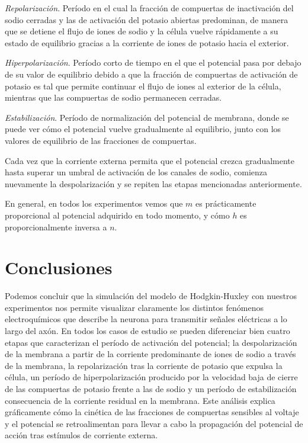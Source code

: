 \documentclass[aps,twocolumn,groupedaddress]{revtex4-2}
\begin{document}
\textit{Repolarización}. Período en el cual la fracción de compuertas de inactivación del sodio cerradas y las de activación del potasio abiertas predominan, de manera que se detiene el flujo de iones de sodio y la célula vuelve rápidamente a su estado de equilibrio gracias a la corriente de iones de potasio hacia el exterior.

\textit{Hiperpolarización}. Período corto de tiempo en el que el potencial pasa por debajo de su valor de equilibrio debido a que la fracción de compuertas de activación de potasio es tal que permite continuar el flujo de iones al exterior de la célula, mientras que las compuertas de sodio permanecen cerradas.

\textit{Estabilización}. Período de normalización del potencial de membrana, donde se puede ver cómo el potencial vuelve gradualmente al equilibrio, junto con los valores de equilibrio de las fracciones de compuertas.

Cada vez que la corriente externa permita que el potencial crezca gradualmente hasta superar un umbral de activación de los canales de sodio, comienza nuevamente la despolarización y se repiten las etapas mencionadas anteriormente.

En general, en todos los experimentos vemos que  $m$ es prácticamente proporcional al potencial adquirido en todo momento, y cómo $h$ es proporcionalmente inversa a $n$.

\section{Conclusiones}
Podemos concluir que la simulación del modelo de Hodgkin-Huxley con nuestros experimentos nos permite visualizar claramente los distintos fenómenos electroquímicos que describe la neurona para transmitir señales eléctricas a lo largo del axón. En todos los casos de estudio se pueden diferenciar bien cuatro etapas que caracterizan el período de activación del potencial; la despolarización de la membrana a partir de la corriente predominante de iones de sodio a través de la membrana, la repolarización tras la corriente de potasio que expulsa la célula, un período de hiperpolarización producido por la velocidad baja de cierre de las compuertas de potasio frente a las de sodio y un período de estabilización consecuencia de la corriente residual en la membrana. Este análisis explica gráficamente cómo la cinética de las fracciones de compuertas sensibles al voltaje y el potencial se retroalimentan para llevar a cabo la propagación del potencial de acción tras estímulos de corriente externa.
\end{document}
